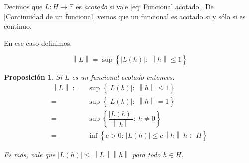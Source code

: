 \documentclass[11pt]{article}
\newcommand{\norm}[1]{\left\lVert#1\right\rVert}
\newcommand{\abs}[1]{\left\lvert#1\right\rvert}
\newcommand{\sett}[1]{\left\lbrace#1\right\rbrace}
\numberwithin{theorem}{subsection}
\newtheorem{proposition}[theorem]{Proposici\'on}
\newenvironment{definition}[1][Definici\'on]{\begin{trivlist}
		\item[\hskip \labelsep {\bfseries #1}]}{\end{trivlist}}
\begin{document}
\begin{definition}
	Decimos que $L : H \rightarrow \mathbb{F}$ es \textit{acotado} si vale \ref{eq: Funcional acotado}. De \ref{Continuidad de un funcional} vemos que un funcional es acotado si y s\'olo si es continuo.
	
	En ese caso definimos:
	
	\begin{equation*}
		\norm{L} = \sup \sett{\abs{L(h)}: \ \norm{h} \leq 1}
	\end{equation*}
	
\end{definition}

\begin{proposition}
	Si $L$ es un funcional acotado entonces:
	\begin{equation}
	\label{eq: Normas equivalentes de un funcional}
	\begin{aligned}
		\norm{L} := & \sup \sett{\abs{L(h)}: \ \norm{h} \leq 1} \\
		= & \sup \sett{\abs{L(h)}: \ \norm{h} = 1}\\
		= & \sup \sett{\dfrac{\abs{L(h)}}{\norm{h}}: \ h \neq 0}  \\
		= & \inf \sett{c > 0: \ \abs{L(h)} \leq c \norm{h} \ h \in H} 
	\end{aligned}	
	\end{equation}
	
	Es m\'as, vale que $\abs{L(h)} \leq \norm{L} \norm{h}$ para todo $h \in H$.
	
\end{proposition}
\end{document}
